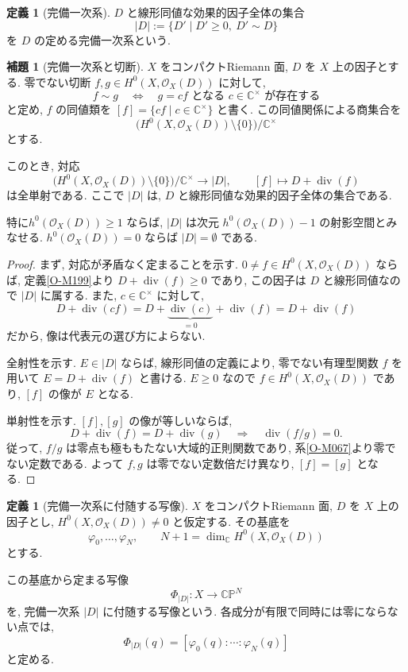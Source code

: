 \documentclass[dvipdfmx,a4paper,11pt]{article} %
\newcommand{\C}{\mathbb{C}}
\theoremstyle{definition}
\numberwithin{equation}{section}
\newtheorem{lem}[thm]{補題}
\newtheorem{dfn}[thm]{定義}
\begin{document}
\begin{dfn}[完備一次系]\label{dfn-complete-linear-system}
$D$ と線形同値な効果的因子全体の集合
\[
|D|:=\{D'\mid D'\geq0,\ D'\sim D\}
\]
を $D$ の定める完備一次系という.
\end{dfn}

\begin{lem}[完備一次系と切断]\label{lem-complete-linear-system}
$X$ をコンパクトRiemann 面, $D$ を $X$ 上の因子とする.
零でない切断 $f,g\in H^0(X,\mathcal O_X(D))$ に対して,
\[
f\sim g
\quad\Longleftrightarrow\quad
g=cf\text{ となる }c\in\C^\times\text{ が存在する}
\]
と定め, $f$ の同値類を
$[f]=\{cf\mid c\in\C^\times\}$ と書く.
この同値関係による商集合を
\[
\bigl(H^0(X,\mathcal O_X(D))\setminus\{0\}\bigr)/\C^\times
\]
とする. 

このとき, 対応
\[
\bigl(H^0(X,\mathcal O_X(D))\setminus\{0\}\bigr)/\C^\times
\longrightarrow |D|,
\qquad [f]\longmapsto D+\operatorname{div}(f)
\]
は全単射である.
ここで $|D|$ は, $D$ と線形同値な効果的因子全体の集合である.

\end{lem}

特に$h^0(\mathcal O_X(D))\geq1$ ならば,
$|D|$ は次元 $h^0(\mathcal O_X(D))-1$ の射影空間とみなせる.
$h^0(\mathcal O_X(D))=0$ ならば $|D|=\emptyset$ である.

\begin{proof}
まず, 対応が矛盾なく定まることを示す.
$0\neq f\in H^0(X,\mathcal O_X(D))$ ならば,
定義\ref{O-M199}より $D+\operatorname{div}(f)\geq0$ であり,
この因子は $D$ と線形同値なので $|D|$ に属する.
また, $c\in\C^\times$ に対して,
\[
D+\operatorname{div}(cf)
=D+\underbrace{\operatorname{div}(c)}_{=0}
+\operatorname{div}(f)
=D+\operatorname{div}(f)
\]
だから, 像は代表元の選び方によらない.

全射性を示す.
$E\in|D|$ ならば, 線形同値の定義により,
零でない有理型関数 $f$ を用いて $E=D+\operatorname{div}(f)$ と書ける.
$E\geq0$ なので $f\in H^0(X,\mathcal O_X(D))$ であり,
$[f]$ の像が $E$ となる.

単射性を示す.
$[f],[g]$ の像が等しいならば,
\[
D+\operatorname{div}(f)=D+\operatorname{div}(g)
\quad\Longrightarrow\quad
\operatorname{div}(f/g)=0.
\]
従って, $f/g$ は零点も極ももたない大域的正則関数であり,
系\ref{O-M067}より零でない定数である.
よって $f,g$ は零でない定数倍だけ異なり, $[f]=[g]$ となる.
\end{proof}



\begin{dfn}[完備一次系に付随する写像]\label{O-M327}
$X$ をコンパクトRiemann 面, $D$ を $X$ 上の因子とし,
$H^0(X,\mathcal O_X(D))\neq0$ と仮定する.
その基底を
\[
\varphi_0,\ldots,\varphi_N,
\qquad N+1=\dim_{\C}H^0(X,\mathcal O_X(D))
\]
とする.

この基底から定まる写像
\[
\Phi_{|D|}:X\longrightarrow\C\mathbb P^N
\]
を, 完備一次系 $|D|$ に付随する写像という.
各成分が有限で同時には零にならない点では,
\[
\Phi_{|D|}(q)=[\varphi_0(q):\cdots:\varphi_N(q)]
\]
と定める.
\end{dfn}
\end{document}
